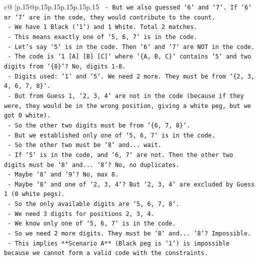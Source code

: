 \documentclass{article}
\begin{document}
{\begin{supertabular}{c@{$\;$}|p{.15\linewidth}@{}p{.15\linewidth}p{.15\linewidth}p{.15\linewidth}p{.15\linewidth}p{.15\linewidth}}
{{{\texttt{                {-}   But we also guessed `6` and `7`. If `6` or `7` are in the code, they would contribute to the count.} \\
\texttt{                {-}   We have 1 Black (`1`) and 1 White. Total 2 matches.} \\
\texttt{                {-}   This means exactly one of `5, 6, 7` is in the code.} \\
\texttt{                {-}   Let's say `5` is in the code. Then `6` and `7` are NOT in the code.} \\
\texttt{                {-}   The code is `1 {[}A{]} {[}B{]} {[}C{]}` where `\{A, B, C\}` contains `5` and two digits from `\{8\}`? No, digits 1{-}8.} \\
\texttt{                {-}   Digits used: `1` and `5`. We need 2 more. They must be from `\{2, 3, 4, 6, 7, 8\}`.} \\
\texttt{                {-}   But from Guess 1, `2, 3, 4` are not in the code (because if they were, they would be in the wrong position, giving a white peg, but we got 0 white).} \\
\texttt{                {-}   So the other two digits must be from `\{6, 7, 8\}`.} \\
\texttt{                {-}   But we established only one of `5, 6, 7` is in the code.} \\
\texttt{                {-}   So the other two must be `8` and... wait.} \\
\texttt{                {-}   If `5` is in the code, and `6, 7` are not. Then the other two digits must be `8` and... `8`? No, no duplicates.} \\
\texttt{                {-}   Maybe `8` and `9`? No, max 8.} \\
\texttt{                {-}   Maybe `8` and one of `2, 3, 4`? But `2, 3, 4` are excluded by Guess 1 (0 white pegs).} \\
\texttt{                {-}   So the only available digits are `5, 6, 7, 8`.} \\
\texttt{                {-}   We need 3 digits for positions 2, 3, 4.} \\
\texttt{                {-}   We know only one of `5, 6, 7` is in the code.} \\
\texttt{                {-}   So we need 2 more digits. They must be `8` and... `8`? Impossible.} \\
\texttt{                {-}   This implies **Scenario A** (Black peg is `1`) is impossible because we cannot form a valid code with the constraints.} \\
}}}
\end{supertabular}}
\end{document}
